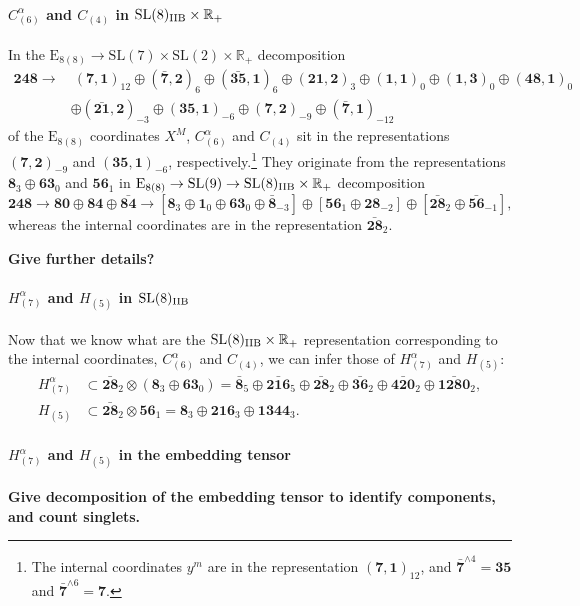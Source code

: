 \documentclass[11pt]{article}
\newcommand{\SL}{\ensuremath{\mathrm{SL}}\xspace}
\newcommand{\E}{\ensuremath{\mathrm{E}}\xspace}
\newcommand{\R}{\ensuremath{\mathbb{R}}\xspace}
\newcommand{\ce}[1]{\marginpar{\parbox{\marginparwidth}{\boldmath $\Longleftarrow$}}
{\boldmath\bfseries #1}}
\begin{document}
\paragraph{\boldmath $C_{(6)}^{\alpha}$ and $C_{(4)}$ in $\SL(8)_{\rm IIB}\times\R_{+}$} In the $\E_{8(8)}\rightarrow\SL(7)\times\SL(2)\times\R_{+}$ decomposition
\begin{equation}
  \begin{aligned}
    \bm{248} \longrightarrow & \ (\bm{7},\bm{1})_{12} \oplus (\bm{\bar{7}},\bm{2})_{6} \oplus (\bm{\bar{35}},\bm{1})_{6} \oplus (\bm{21},\bm{2})_{3} \oplus (\bm{1},\bm{1})_{0} \oplus (\bm{1},\bm{3})_{0} \oplus (\bm{48},\bm{1})_{0} \\
    & \oplus (\bm{\bar{21}},\bm{2})_{-3} \oplus (\bm{35},\bm{1})_{-6} \oplus (\bm{7},\bm{2})_{-9} \oplus (\bm{\bar{7}},\bm{1})_{-12}
  \end{aligned} 
\end{equation}
of the $\E_{8(8)}$ coordinates $X^{M}$, $C_{(6)}^{\alpha}$ and $C_{(4)}$ sit in the representations $(\bm{7},\bm{2})_{-9}$ and $(\bm{35},\bm{1})_{-6}$, respectively.\footnote{The internal coordinates $y^{m}$ are in the representation $(\bm{7},\bm{1})_{12}$, and $\bm{\bar{7}}^{\wedge 4}=\bm{35}$ and $\bm{\bar{7}}^{\wedge 6}=\bm{7}$.} They originate from the representations $\bm{8}_{3}\oplus\bm{63}_{0}$ and $\bm{56}_{1}$ in $\E_{8(8)}\rightarrow\SL(9)\rightarrow\SL(8)_{\rm IIB}\times\R_{+}$ decomposition
\begin{equation}
  \bm{248} \longrightarrow \bm{80} \oplus \bm{84} \oplus \bm{\bar{84}} \longrightarrow \left[\bm{8}_{3} \oplus \bm{1}_{0} \oplus \bm{63}_{0} \oplus \bm{\bar{8}}_{-3}\right] \oplus \left[\bm{56}_{1} \oplus \bm{28}_{-2}\right] \oplus \left[\bm{\bar{28}}_{2} \oplus \bm{\bar{56}}_{-1}\right],
\end{equation}
whereas the internal coordinates are in the representation $\bm{\bar{28}}_{2}$.

\ce{Give further details?}

\paragraph{\boldmath $H_{(7)}^{\alpha}$ and $H_{(5)}$ in $\SL(8)_{\rm IIB}$} Now that we know what are the $\SL(8)_{\rm IIB}\times\R_{+}$ representation corresponding to the internal coordinates, $C_{(6)}^{\alpha}$ and $C_{(4)}$, we can infer those of $H_{(7)}^{\alpha}$ and $H_{(5)}$:
\begin{equation}
  \begin{aligned}
    H_{(7)}^{\alpha} & \subset \bm{\bar{28}}_{2} \otimes \left(\bm{8}_{3}\oplus\bm{63}_{0}\right) = \bm{\bar{8}}_{5} \oplus \bm{\bar{216}}_{5} \oplus \bm{\bar{28}}_{2} \oplus \bm{\bar{36}}_{2} \oplus \bm{\bar{420}}_{2} \oplus \bm{\bar{1280}}_{2}, \\
    H_{(5)} & \subset \bm{\bar{28}}_{2} \otimes \bm{56}_{1} = \bm{8}_{3} \oplus \bm{216}_{3} \oplus \bm{1344}_{3}.
  \end{aligned}
\end{equation}

\paragraph{\boldmath $H_{(7)}^{\alpha}$ and $H_{(5)}$ in the embedding tensor}

\ce{Give decomposition of the embedding tensor to identify components, and count singlets.}


\end{document}
